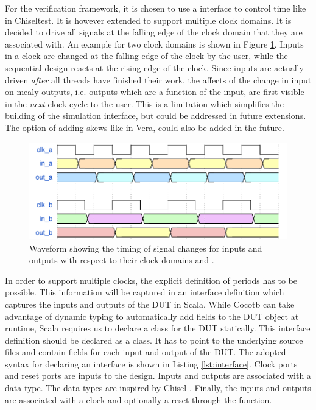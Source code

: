 For the verification framework, it is chosen to use a  interface to control time like in Chiseltest. It is
however extended to support multiple clock domains. It is decided to drive all signals at the falling edge of the
clock domain that they are associated with. An example for two clock domains is shown in Figure \ref{fig:wavedrom}. Inputs in a clock are changed at the falling edge of the clock by the user, while the sequential design reacts at the rising edge of the clock. Since inputs are actually driven \textit{after} all threads have finished their work, the affects of the change in input on mealy outputs, i.e. outputs which are a function of the input, are first visible in the \textit{next} clock cycle to the user. This is a limitation which simplifies the building of the simulation interface, but could be addressed in future extensions. The option of adding skews like in Vera, could also be added in the future. 
\begin{figure}
\centering
\includegraphics[width=\textwidth]{diagrams/wavedrom.pdf}
\caption{Waveform showing the timing of signal changes for inputs and outputs with respect to their clock domains  and .}
\label{fig:wavedrom}
\end{figure}

In order to support multiple clocks, the explicit definition of periods has to be possible. This information will be captured in an interface definition which captures the inputs and outputs of the DUT in
Scala. While Cocotb can take advantage of dynamic typing to automatically add fields to the DUT object at runtime,
Scala requires us to declare a class for the DUT statically. This interface definition should be declared as a class.
It has to point to the underlying source files and contain fields for each input and output of the DUT. The adopted
syntax for declaring an interface is shown in Listing \ref{lst:interface}. Clock ports and reset ports are inputs to
the design. Inputs and outputs are associated with a data type. The data types are inspired by Chisel
\cite{chiselpaper}. Finally, the inputs and outputs are associated with a clock and optionally a reset through the
 function.

